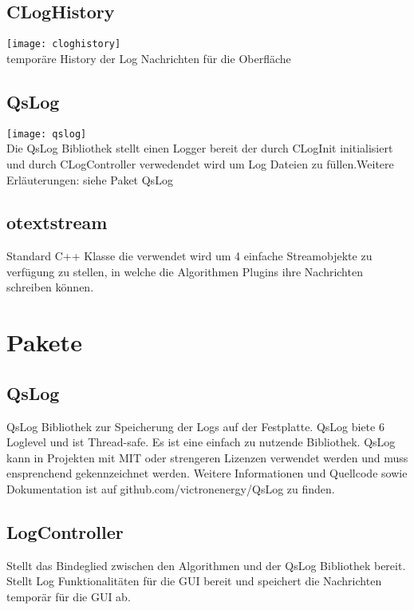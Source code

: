 \subsection{CLogHistory}\label{Logger: CLogHistory}
\texttt{[image: cloghistory]}\\
temporäre History der Log Nachrichten für die Oberfläche 
\beginMembers
{}
\closeMembers
\subsection{QsLog}\label{Logger: QsLog}
\texttt{[image: qslog]}\\
Die QsLog Bibliothek stellt einen Logger bereit der durch CLogInit initialisiert und durch CLogController verwedendet wird um Log Dateien zu füllen.Weitere Erläuterungen: siehe Paket QsLog

\subsection{otextstream}\label{Logger: otextstream}
Standard C++ Klasse die verwendet wird um 4 einfache Streamobjekte zu verfügung zu stellen, in welche die Algorithmen Plugins ihre Nachrichten schreiben können.
\section{Pakete}
\subsection{QsLog}
QsLog Bibliothek zur Speicherung der Logs auf der Festplatte.
QsLog biete 6 Loglevel und ist Thread-safe. Es ist eine einfach zu nutzende Bibliothek.
QsLog kann in Projekten mit MIT oder strengeren Lizenzen verwendet werden und muss ensprenchend gekennzeichnet werden.
Weitere Informationen und Quellcode sowie Dokumentation ist auf github.com/victronenergy/QsLog zu finden.
\subsection{LogController}
Stellt das Bindeglied zwischen den Algorithmen und der QsLog Bibliothek bereit.
Stellt Log Funktionalitäten für die GUI bereit und speichert die Nachrichten temporär für die GUI ab.
